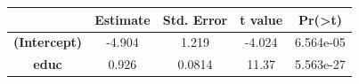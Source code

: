 \documentclass[]{article}
\begin{document}
\begin{longtable}[]{@{}ccccc@{}}
\toprule
\begin{minipage}[b]{0.21\columnwidth}\centering\strut
~\strut
\end{minipage} & \begin{minipage}[b]{0.13\columnwidth}\centering\strut
Estimate\strut
\end{minipage} & \begin{minipage}[b]{0.16\columnwidth}\centering\strut
Std. Error\strut
\end{minipage} & \begin{minipage}[b]{0.12\columnwidth}\centering\strut
t value\strut
\end{minipage} & \begin{minipage}[b]{0.13\columnwidth}\centering\strut
Pr(\textgreater{}\textbar{}t\textbar{})\strut
\end{minipage}\tabularnewline
\midrule
\endhead
\begin{minipage}[t]{0.21\columnwidth}\centering\strut
\textbf{(Intercept)}\strut
\end{minipage} & \begin{minipage}[t]{0.13\columnwidth}\centering\strut
-4.904\strut
\end{minipage} & \begin{minipage}[t]{0.16\columnwidth}\centering\strut
1.219\strut
\end{minipage} & \begin{minipage}[t]{0.12\columnwidth}\centering\strut
-4.024\strut
\end{minipage} & \begin{minipage}[t]{0.13\columnwidth}\centering\strut
6.564e-05\strut
\end{minipage}\tabularnewline
\begin{minipage}[t]{0.21\columnwidth}\centering\strut
\textbf{educ}\strut
\end{minipage} & \begin{minipage}[t]{0.13\columnwidth}\centering\strut
0.926\strut
\end{minipage} & \begin{minipage}[t]{0.16\columnwidth}\centering\strut
0.0814\strut
\end{minipage} & \begin{minipage}[t]{0.12\columnwidth}\centering\strut
11.37\strut
\end{minipage} & \begin{minipage}[t]{0.13\columnwidth}\centering\strut
5.563e-27\strut
\end{minipage}\tabularnewline

\end{longtable}
\end{document}
